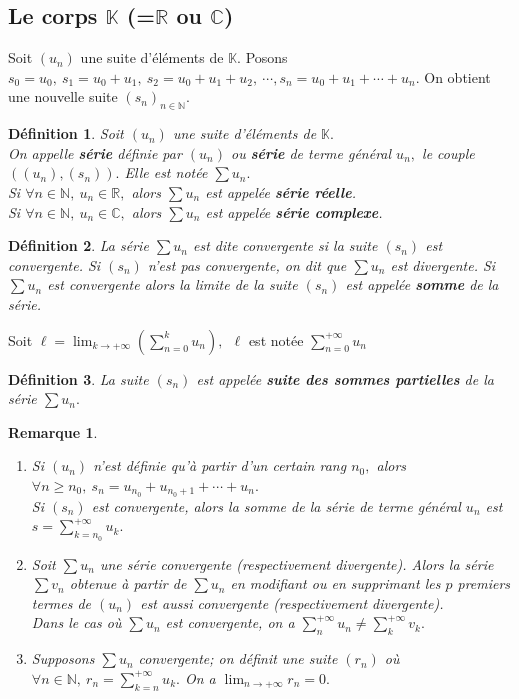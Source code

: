 \documentclass[11pt, a4paper]{book}
\newtheorem{defi}{D\'efinition}[section]
\newtheorem{rem}{Remarque}[section]
\begin{document}
\subsection{ Le corps $\mathbb{K}$ (=$\mathbb{R}$ ou $ \mathbb{C}$) }
Soit $(u_{n})$ une suite d'\'el\'ements de $ \mathbb{K}.$ Posons $s_{0}=u_{0},~s_{1}=u_{0}+u_{1},~s_{2}=u_{0}+u_{1}+u_{2},~ \cdots, s_{n}=u_{0}+u_{1}+ \cdots +u_{n}.$ On obtient une nouvelle suite $(s_{n})_{n \in \mathbb{N}}.$
\begin{defi} Soit $(u_{n})$ une suite d'\'el\'ements de $ \mathbb{K}.$\\
On appelle \textbf{s\'erie} d\'efinie par $(u_{n})$ ou \textbf{s\'erie} de terme g\'en\'eral $u_{n},$ le couple $\left((u_{n}),(s_{n})\right).$ Elle est not\'ee $ \sum u_{n}.$\\
Si $\forall n \in \mathbb{N},~ u_{n} \in \mathbb{R},$ alors $\sum u_{n}$ est appel\'ee \textbf{ s\'erie r\'eelle}.\\
Si $\forall n \in \mathbb{N},~ u_{n} \in \mathbb{C},$ alors $ \sum u_{n}$ est appel\'ee \textbf{s\'erie complexe}. \end{defi}
\begin{defi} La s\'erie $\sum u_{n}$ est dite convergente si la suite $(s_{n})$ est convergente. Si $(s_{n})$ n'est pas convergente, on dit que $\sum u_{n}$ est divergente. Si $\sum u_{n}$ est convergente alors la limite de la suite $(s_{n})$ est appel\'ee \textbf{somme} de la s\'erie.\end{defi}
Soit ${\displaystyle \ell= \lim_{k \rightarrow +\infty}\left( \sum_{n=0}^{k}u_{n}\right), ~~ \ell}$ est not\'ee ${\displaystyle \sum_{n=0}^{+\infty}u_{n}}$
\begin{defi} La suite $(s_{n})$ est appel\'ee \textbf{suite des sommes partielles} de la s\'erie $\sum u_{n}.$ \end{defi}
\begin{rem} \label{rem2b} \begin{enumerate}
\item[a)]\label{rem2a} Si $(u_{n})$ n'est d\'efinie qu'\`a partir d'un certain rang $n_{0},$ alors $\forall n \geq n_{0},~s_{n}=u_{n_{0}}+u_{n_{0}+1}+\cdots +u_{n}.$\\
Si $(s_{n})$ est convergente, alors la somme de la s\'erie de terme g\'en\'eral $u_{n}$ est ${\displaystyle s=\sum_{k=n_{0}}^{+\infty}u_{k}}.$\\
\item[b)]\label{rem2b}  Soit $\sum u_{n}$ une s\'erie convergente (respectivement divergente). Alors la s\'erie $\sum v_{n}$ obtenue \`a partir de $\sum u_{n}$ en modifiant ou en supprimant les $p$ premiers termes de $(u_{n})$ est aussi convergente (respectivement divergente).\\
Dans le cas o\`u $\sum u_{n}$ est convergente, on a ${\displaystyle\sum_{n}^{+ \infty} u_{n} \neq \sum_{k}^{+\infty} v_{k}}.$
\item[c)]\label{rem2c} Supposons $\sum u_{n}$ convergente; on d\'efinit une suite $(r_{n})$ o\`u $\forall n\in \mathbb{N},~{\displaystyle r_{n}=\sum_{k=n}^{+\infty} u_{k}}.$ On a ${\displaystyle\lim_{n \rightarrow +\infty} r_{n}=0}.$ 
\end{enumerate} \end{rem}
\end{document}
